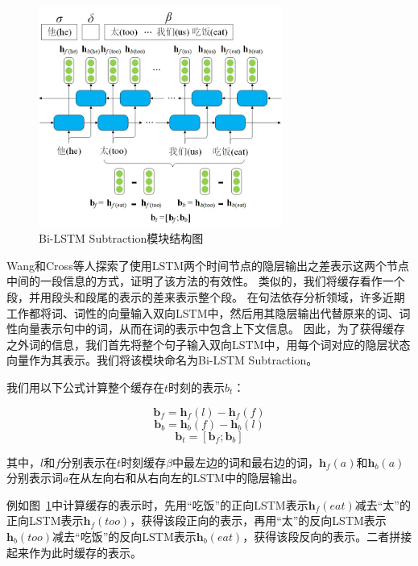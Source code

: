 \begin{figure}[hbtp]
	\centering
	\includegraphics[width=80mm]{figures/bs.jpg}
	\caption{Bi-LSTM Subtraction模块结构图}
	\label{fig:bs}
\end{figure}

Wang和Cross等人探索了使用LSTM两个时间节点的隐层输出之差表示这两个节点中间的一段信息的方式，证明了该方法的有效性。\cite{wang-chang:2016:P16-1,cross-huang:2016:EMNLP2016}
类似的，我们将缓存看作一个段，并用段头和段尾的表示的差来表示整个段。
在句法依存分析领域，许多近期工作\cite{wang-EtAl:2016:N16-12,kiperwasser2016simple}都将词、词性的向量输入双向LSTM中，然后用其隐层输出代替原来的词、词性向量表示句中的词，从而在词的表示中包含上下文信息。
因此，为了获得缓存之外词的信息，我们首先将整个句子输入双向LSTM中，用每个词对应的隐层状态向量作为其表示。我们将该模块命名为Bi-LSTM Subtraction。

我们用以下公式计算整个缓存在$t$时刻的表示$b_t$：

\begin{equation}
	\mathbf{b}_f=\mathbf{h}_f(l)-\mathbf{h}_f(f)
\end{equation}
\begin{equation}
	\mathbf{b}_b=\mathbf{h}_b(f)-\mathbf{h}_b(l)
\end{equation}
\begin{equation}
	\mathbf{b}_t=[\mathbf{b}_f ; \mathbf{b}_b]
\end{equation}

其中，$l$和$f$分别表示在$t$时刻缓存$\beta$中最左边的词和最右边的词，$\mathbf{h}_f(a)$和$\mathbf{h}_b(a)$分别表示词$a$在从左向右和从右向左的LSTM中的隐层输出。

例如图~\ref{fig:bs}中计算缓存的表示时，先用“吃饭”的正向LSTM表示$\mathbf{h}_f(eat)$减去“太”的正向LSTM表示$\mathbf{h}_f(too)$，获得该段正向的表示，再用“太”的反向LSTM表示$\mathbf{h}_b(too)$减去“吃饭”的反向LSTM表示$\mathbf{h}_b(eat)$，获得该段反向的表示。二者拼接起来作为此时缓存的表示。

